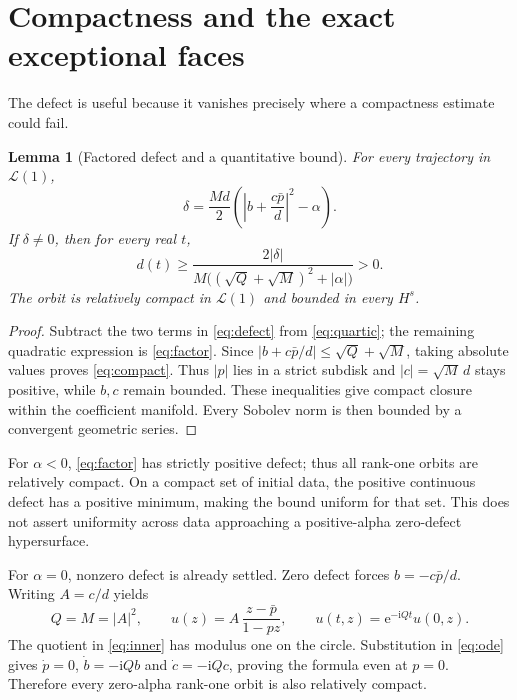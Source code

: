 \documentclass[10pt]{article}
\newcommand{\ii}{\mathrm i}
\newcommand{\e}{\mathrm e}
\newcommand{\LL}{\mathcal L}
\newtheorem{lemma}{Lemma}
\begin{document}
\section{Compactness and the exact exceptional faces}
The defect is useful because it vanishes precisely where a compactness
estimate could fail.
\begin{lemma}[Factored defect and a quantitative bound]
For every trajectory in $\LL(1)$,
\begin{equation}
 \delta=\frac{Md}{2}\left(\left|b+\frac{c\bar p}{d}\right|^2-\alpha\right).
 \label{eq:factor}
\end{equation}
If $\delta\ne0$, then for every real $t$,
\begin{equation}
 d(t)\ge
 \frac{2|\delta|}{M\big((\sqrt Q+\sqrt M)^2+|\alpha|\big)}>0.
 \label{eq:compact}
\end{equation}
The orbit is relatively compact in $\LL(1)$ and bounded in every $H^s$.
\end{lemma}
\begin{proof}
Subtract the two terms in \eqref{eq:defect} from \eqref{eq:quartic};
the remaining quadratic expression is \eqref{eq:factor}.
Since $|b+c\bar p/d|\le\sqrt Q+\sqrt M$,
taking absolute values proves \eqref{eq:compact}.
Thus $|p|$ lies in a strict subdisk and
$|c|=\sqrt M\,d$ stays positive, while $b,c$ remain bounded.
These inequalities give compact closure within the coefficient manifold.
Every Sobolev norm is then bounded by a convergent geometric series.
\end{proof}

For $\alpha<0$, \eqref{eq:factor} has strictly positive defect; thus all
rank-one orbits are relatively compact. On a compact set of initial data,
the positive continuous defect has a positive minimum, making the bound
uniform for that set. This does not assert uniformity across data approaching
a positive-alpha zero-defect hypersurface.

For $\alpha=0$, nonzero defect is already settled. Zero defect forces
$b=-c\bar p/d$. Writing $A=c/d$ yields
\begin{equation}
 Q=M=|A|^2,\qquad
 u(z)=A\,\frac{z-\bar p}{1-pz},\qquad
 u(t,z)=\e^{-\ii Qt}u(0,z).
 \label{eq:inner}
\end{equation}
The quotient in \eqref{eq:inner} has modulus one on the circle. Substitution
in \eqref{eq:ode} gives $\dot p=0$, $\dot b=-\ii Qb$ and
$\dot c=-\ii Qc$, proving the formula even at $p=0$.
Therefore every zero-alpha rank-one orbit is also relatively compact.
\end{document}
